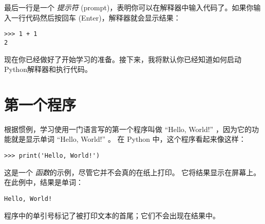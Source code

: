最后一行是一个 {\em 提示符} (prompt)，表明你可以在解释器中输入代码了。如果你输入一行代码然后按回车 (Enter)，解释器就会显示结果：
  

\begin{lstlisting}
>>> 1 + 1
2
\end{lstlisting}

%

现在你已经做好了开始学习的准备。接下来，我将默认你已经知道如何启动Python解释器和执行代码。


\section{第一个程序}

\label{hello}


根据惯例，学习使用一门语言写的第一个程序叫做 ``Hello, World!'' ，因为它的功能就是显示单词 ``Hello, World!'' 。 在 Python 中，这个程序看起来像这样：

\begin{lstlisting}
>>> print('Hello, World!')
\end{lstlisting}

%

这是一个  {\em 函数}的示例，尽管它并不会真的在纸上打印。 它将结果显示在屏幕上。 在此例中，结果是单词：

\begin{lstlisting}
Hello, World!
\end{lstlisting}

%

程序中的单引号标记了被打印文本的首尾；它们不会出现在结果中。
    
    

